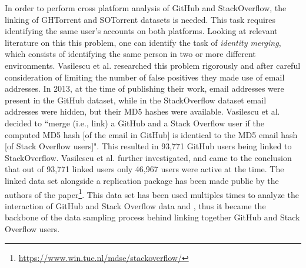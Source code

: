         In order to perform cross platform analysis of GitHub and StackOverflow, the linking of GHTorrent and SOTorrent datasets is needed. This task requires identifying the same user's accounts on both platforms. Looking at relevant literature on this this problem, one can identify the task of \textit{identity merging}, which consists of identifying the same person in two or more different environments. Vasilescu et al. \cite{vasilescu2013stackoverflow} researched this problem rigorously and after careful consideration of limiting the number of false positives they made use of email addresses. In 2013, at the time of publishing their work, email addresses were present in the GitHub dataset, while in the StackOverflow dataset email addresses were hidden, but their MD5 hashes were available. Vasilescu et al. \cite{vasilescu2013stackoverflow} decided to ``merge (i.e., link) a GitHub and a Stack Overflow user if the computed MD5 hash [of the email in GitHub] is identical to the MD5 email hash [of Stack Overflow users]". This resulted in 93,771 GitHub users being linked to StackOverflow. Vasilescu et al. \cite{vasilescu2013stackoverflow} further investigated, and came to the conclusion that out of 93,771 linked users only 46,967 users were active at the time. The linked data set alongside a replication package has been made public by the authors of the paper\footnote{\label{bodgan_dataset}\url{https://www.win.tue.nl/mdse/stackoverflow/}}. This data set has been used multiples times to analyze the interaction of GitHub and Stack Overflow data \cite{badashian2014involvement} and \cite{lee2017GitHub}, thus it became the backbone of the data sampling process behind linking together GitHub and Stack Overflow users.  

